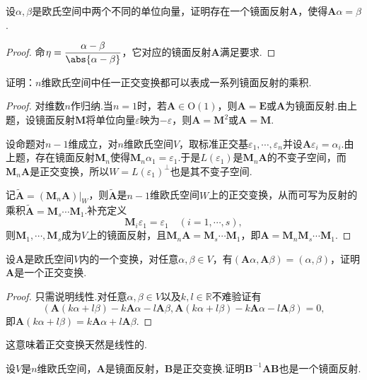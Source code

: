 \begin{prob}[4]
	设$\alpha,\beta$是欧氏空间中两个不同的单位向量，证明存在一个镜面反射$\bm A$，使得$\bm A\alpha=\beta$.
\end{prob}
\begin{proof}
	命$\eta=\dfrac{\alpha-\beta}{\abs{\alpha-\beta}}$，它对应的镜面反射$\bm A$满足要求.
\end{proof}
\begin{prob}[5]
	证明：$n$维欧氏空间中任一正交变换都可以表成一系列镜面反射的乘积.
\end{prob}
\begin{proof}
	对维数$n$作归纳.当$n=1$时，若$\bm A\in\mathrm{O}(1)$，则$\bm A=\bm E$或$\bm A$为镜面反射.由上题，设镜面反射$\bm M$将单位向量$\varepsilon$映为$-\varepsilon$，则$\bm A=\bm M^2$或$\bm A=\bm M$.

	设命题对$n-1$维成立，对$n$维欧氏空间$V$，取标准正交基$\varepsilon_1,\cdots,\varepsilon_n$并设$\bm A\varepsilon_i=\alpha_i$.由上题，存在镜面反射$\bm M_n$使得$\bm M_n\alpha_1=\varepsilon_1$.于是$L(\varepsilon_1)$是$\bm M_n\bm A$的不变子空间，而$\bm M_n\bm A$是正交变换，所以$W=L(\varepsilon_1)^\perp$也是其不变子空间.

	记$\widetilde{\bm A}=(\bm M_n\bm A)|_W$，则$\widetilde{\bm A}$是$n-1$维欧氏空间$W$上的正交变换，从而可写为反射的乘积$\widetilde{\bm A}=\bm M_s\cdots\bm M_1$.补充定义
	\[
		\bm M_i\varepsilon_1=\varepsilon_1\quad(i=1,\cdots,s),
	\]
	则$\bm M_1,\cdots,\bm M_{s}$成为$V$上的镜面反射，且$\bm M_{n}\bm A=\bm M_{s}\cdots\bm M_1$，即$\bm A=\bm M_n\bm M_s\cdots\bm M_1$.
\end{proof}
\begin{prob}[6]
	设$\bm A$是欧氏空间$V$内的一个变换，对任意$\alpha,\beta\in V$，有$(\bm A\alpha,\bm A\beta)=(\alpha,\beta)$，证明$\bm A$是一个正交变换.
\end{prob}
\begin{proof}
	只需说明线性.对任意$\alpha,\beta\in V$以及$k,l\in\mathbb{R}$不难验证有
	\[
		(\bm A(k\alpha+l\beta)-k\bm A\alpha-l\bm A\beta,\bm A(k\alpha+l\beta)-k\bm A\alpha-l\bm A\beta)=0,
	\]
	即$\bm A(k\alpha+l\beta)=k\bm A\alpha+l\bm A\beta$.
\end{proof}
\begin{note}
	这意味着正交变换天然是线性的.
\end{note}
\begin{prob}[7]
	设$V$是$n$维欧氏空间，$\bm A$是镜面反射，$\bm B$是正交变换.证明$\bm B^{-1}\bm A\bm B$也是一个镜面反射.
\end{prob}

